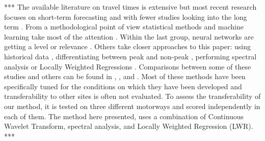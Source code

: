 \documentclass[letterpaper, 10 pt, conference]{ieeeconf}  %
\begin{document}
***
The available literature on travel times is extensive but most recent research focuses on short-term forecasting and with fewer studies looking into the long term \cite{long-term} \cite{long-term-2}. 
From a methodological point of view statistical methods and machine learning take most of the attention \cite{should}. Within the last group, neural networks are getting a level or relevance \cite{NN} \cite{spectral2} .
Others take closer approaches to this paper: using historical data \cite{simple} \cite{dynamic-historic}, differentiating between peak and non-peak \cite{peak-historic}, performing spectral analysis \cite{spectral1} or Locally Weighted Regressions \cite{williams} \cite{sun} \cite{zhong} \cite{chowdhury} \cite{acqua} \cite{vana}.
Comparisons between some of these studies and others can be found in \cite{nikovski}, \cite{lint}, \cite{mori} and \cite{ser}. 
Most of these methods have been specifically tuned for the conditions on which they have been developed and transferability to other sites is often not evaluated.
To assess the transferability of our method, it is tested on three different motorways and scored independently in each of them.
The method here presented, uses a combination of Continuous Wavelet Transform, spectral analysis, and Locally Weighted Regression (LWR).
***
\end{document}
